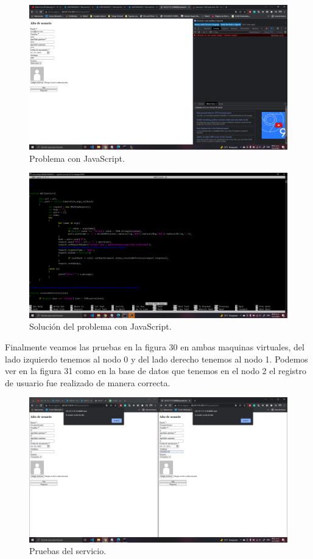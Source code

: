 \documentclass[11pt]{article}
\begin{document}
		\begin{figure}[H]
			\centering
			\includegraphics[scale=0.34]{resources/problema1.png}
			\caption{Problema con JavaScript.}\label{fig:picture}
		\end{figure}
		\begin{figure}[H]
			\centering
			\includegraphics[scale=0.34]{resources/solucionproblema1.png}
			\caption{Solución del problema con JavaScript.}\label{fig:picture}
		\end{figure}
		Finalmente veamos las pruebas en la figura 30 en ambas maquinas virtuales, del lado izquierdo tenemos al nodo 0 y del lado derecho tenemos al nodo 1. Podemos ver en la figura 31 como en la base de datos que tenemos en el nodo 2 el registro de usuario fue realizado de manera correcta.
		\begin{figure}[H]
			\centering
			\includegraphics[scale=0.34]{resources/tp5.1.png}
			\caption{Pruebas del servicio.}\label{fig:picture}
		\end{figure}
\end{document}

